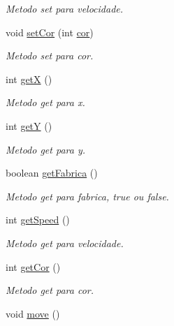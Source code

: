 \begin{DoxyCompactItemize}
\begin{DoxyCompactList}\small\item\em Metodo set para velocidade. \end{DoxyCompactList}\item 
\mbox{\label{class_veiculo_ab7fc7e6551ab238df0fb51a1a5c7d66f}} 
void \mbox{\hyperlink{class_veiculo_ab7fc7e6551ab238df0fb51a1a5c7d66f}{set\+Cor}} (int \mbox{\hyperlink{class_veiculo_aad500265aeb92689ca66ec5bd87787a9}{cor}})
\begin{DoxyCompactList}\small\item\em Metodo set para cor. \end{DoxyCompactList}\item 
\mbox{\label{class_veiculo_a235b29e1e25ec8c769b20fb2aeba8404}} 
int \mbox{\hyperlink{class_veiculo_a235b29e1e25ec8c769b20fb2aeba8404}{getX}} ()
\begin{DoxyCompactList}\small\item\em Metodo get para x. \end{DoxyCompactList}\item 
\mbox{\label{class_veiculo_a06b2a923e51186673a016f75d10363d3}} 
int \mbox{\hyperlink{class_veiculo_a06b2a923e51186673a016f75d10363d3}{getY}} ()
\begin{DoxyCompactList}\small\item\em Metodo get para y. \end{DoxyCompactList}\item 
\mbox{\label{class_veiculo_a6447f0eeb99399f1f96e835c22a88479}} 
boolean \mbox{\hyperlink{class_veiculo_a6447f0eeb99399f1f96e835c22a88479}{get\+Fabrica}} ()
\begin{DoxyCompactList}\small\item\em Metodo get para fabrica, true ou false. \end{DoxyCompactList}\item 
\mbox{\label{class_veiculo_a8895a299d223a6d5d9b83c97c8ac1b24}} 
int \mbox{\hyperlink{class_veiculo_a8895a299d223a6d5d9b83c97c8ac1b24}{get\+Speed}} ()
\begin{DoxyCompactList}\small\item\em Metodo get para velocidade. \end{DoxyCompactList}\item 
\mbox{\label{class_veiculo_a4fed5f48e6ddcf1c3e9a5a5ff9ba3067}} 
int \mbox{\hyperlink{class_veiculo_a4fed5f48e6ddcf1c3e9a5a5ff9ba3067}{get\+Cor}} ()
\begin{DoxyCompactList}\small\item\em Metodo get para cor. \end{DoxyCompactList}\item 
void \mbox{\hyperlink{class_veiculo_a3341b0ed6b4d34db990a31f7a499ae80}{move}} ()
\end{DoxyCompactItemize}
